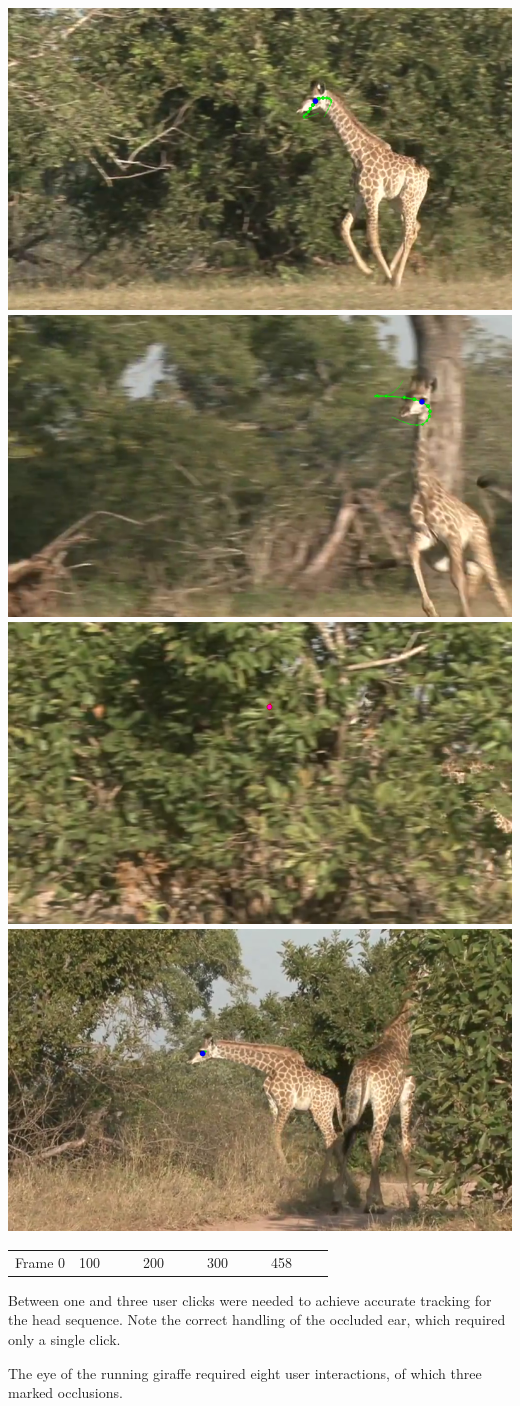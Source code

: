 \documentclass[landscape,final,paperwidth=48in,paperheight=38in]{baposter}
\newtheorem{definition}{Definition}
\begin{document}
\begin{poster}
{{          \includegraphics[width=0.2\linewidth]{giraffe-run-100-rastered}%
          \includegraphics[width=0.2\linewidth]{giraffe-run-200-rastered}%
          \includegraphics[width=0.2\linewidth]{giraffe-run-300-rastered}%
          \includegraphics[width=0.2\linewidth]{giraffe-run-458-rastered}%
      }
  \begin{tabular*}{\linewidth}{*{5}{@{}p{0.2\linewidth}@{}}}
    {\hfill{}Frame 0\hfill{}}  &
    {\hfill{}100\hfill{}} &
    {\hfill{}200\hfill{}} &
    {\hfill{}300\hfill{}} &
    {\hfill{}458\hfill{}} 
  \end{tabular*}
      \begin{multicols}{2}
    Between one and three user clicks were needed to achieve accurate tracking for
      the head sequence. Note the correct handling of the occluded ear, which
      required only a single click. 

      The eye of the running giraffe required eight user interactions, of which three
      marked occlusions. 
      \end{multicols}
      \vspace{-0.6em}
}\label{Applications}

\end{poster}
\end{document}
